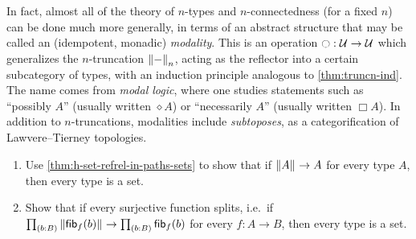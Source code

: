 In fact, almost all of the theory of $n$-types and $n$-connectedness (for a fixed $n$) can be done much more generally, in terms of an abstract structure that may be called an (idempotent, monadic) \emph{modality}.
This is an operation $\modal:\type\to\type$ which generalizes the $n$-truncation $\trunc n-$, acting as the reflector into a certain subcategory of types, with an induction principle analogous to \autoref{thm:truncn-ind}.
The name comes from \emph{modal logic}, where one studies statements such as ``possibly $A$'' (usually written $\diamond A$) or ``necessarily $A$'' (usually written $\Box A$).
In addition to $n$-truncations, modalities include \emph{subtoposes}, as a categorification of Lawvere--Tierney topologies.

\sectionExercises

\begin{ex}
  \begin{enumerate}
    \item Use \autoref{thm:h-set-refrel-in-paths-sets} to show 
    that if $\brck{A}\to A$ for every type $A$, 
    then every type is a set.
    \item Show that if every surjective function splits, 
    i.e.~if $\prd{b:B}\brck{\hfib{f}{b}}\to\prd{b:B}\hfib{f}{b}$
    for every $f:A\to B$, then every type is a set.
  \end{enumerate}
\end{ex}

\egroup

